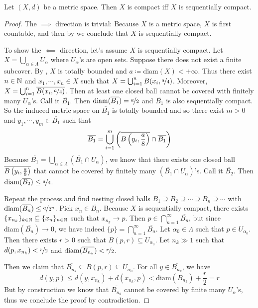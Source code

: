 \documentclass{techreport}
\begin{document}
\begin{proposition}\label{Prop:MetricCompactIffSeqCompact}
	Let $(X,d)$ be a metric space.
	Then $X$ is compact iff $X$ is sequentially compact.
\end{proposition}
\begin{proof}
	The ${\implies}$ direction is trivial: Because $X$ is a metric space, $X$ is first countable, and then by  we conclude that $X$ is sequentially compact.
	
	To show the ${\impliedby}$ direction, let's assume $X$ is sequentially compact.
	Let $X = \bigcup_{\alpha \in \Lambda} U_\alpha$ where $U_\alpha$'s are open sets.
	Suppose there does not exist a finite subcover.
	By , $X$ is totally bounded and $a	\coloneqq \mathrm{diam}(X) < +\infty$.
	Thus there exist $n \in \mathbb{N}$ and $x_1,\cdots,x_n \in X$ such that $X = \bigcup_{i=1}^n B(x_i, \nicefrac{a}{4})$.
	Moreover, $X = \bigcup_{i=1}^n \overline{B(x_i, \nicefrac{a}{4})}$.
	Then at least one closed ball cannot be covered with finitely many $U_\alpha$'s.
	Call it $\overline{B_1}$. Then $\mathrm{diam}(\overline{B_1}) = \nicefrac{a}{2}$ and $\overline{B_1}$ is also sequentially compact.
	So the induced metric space on $\overline{B_1}$ is totally bounded and so there exist $m > 0$ and $y_1,\cdots,y_m \in \overline{B_1}$ such that
	\[
	\overline{B_1} = \bigcup_{i=1}^m\left({ \overline{B\left({y_i,\frac{a}{8}}\right)} \cap \overline{B_1} }\right)
	\]
	Because $\overline{B_1}=\bigcup_{\alpha \in \Lambda} (\overline{B_1} \cap U_\alpha)$, we know that there exists one closed ball $\overline{B\left({y_i,\frac{a}{8}}\right)}$ that cannot be covered by finitely many $(\overline{B_1} \cap U_\alpha)$'s.
	Call it $\overline{B_2}$. Then $\mathrm{diam}(\overline{B_2}) \le \nicefrac{a}{4}$.
	
	Repeat the process and find nesting closed balls $\overline{B_1} \supseteq \overline{B_2} \supseteq \cdots \supseteq \overline{B_n} \supseteq \cdots$ with $\mathrm{diam}(\overline{B_n}) \le \nicefrac{a}{2^n}$.
	Pick $x_n \in \overline{B_n}$.
	Because $X$ is sequentially compact, there exists $\{x_{n_k}\}_{k \in \mathbb{N}} \subseteq \{x_n\}_{n \in \mathbb{N}}$ such that $x_{n_k} \rightarrow p$.
	Then $p \in \bigcap_{n=1}^\infty \overline{B_n}$, but since $\mathrm{diam}(\overline{B_n}) \rightarrow 0$, we have indeed $\{p\} = \bigcap_{n=1}^\infty \overline{B_n}$.
	Let $\alpha_0 \in \Lambda$ such that $p \in U_{\alpha_0}$.
	Then there exists $r > 0$ such that $B(p,r) \subseteq U_{\alpha_0}$.
	Let $n_k \gg 1$ such that $d(p,x_{n_k}) < \nicefrac{r}{2}$ and $\mathrm{diam}(\overline{B_{n_k}}) < \nicefrac{r}{2}$.
	
	Then we claim that $\overline{B_{n_k}} \subseteq B(p,r) \subseteq U_{\alpha_0}$.
	For all $y \in \overline{B_{n_k}}$, we have
	\[
	d(y,p) \le d(y,x_{n_k}) + d(x_{n_k}, p) < \mathrm{diam}(\overline{B_{n_k}}) + \frac{r}{2} = r
	\]
	But by construction we know that $\overline{B_{n_k}}$ cannot be covered by finite many $U_\alpha$'s, thus we conclude the proof by contradiction.
\end{proof}
\end{document}
